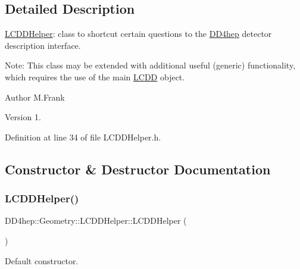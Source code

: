 \subsection{Detailed Description}
\hyperlink{class_d_d4hep_1_1_geometry_1_1_l_c_d_d_helper}{L\+C\+D\+D\+Helper}\+: class to shortcut certain questions to the \hyperlink{namespace_d_d4hep}{D\+D4hep} detector description interface. 

Note\+: This class may be extended with additional useful (generic) functionality, which requires the use of the main \hyperlink{class_d_d4hep_1_1_geometry_1_1_l_c_d_d}{L\+C\+DD} object.

\begin{DoxyAuthor}{Author}
M.\+Frank 
\end{DoxyAuthor}
\begin{DoxyVersion}{Version}
1. 
\end{DoxyVersion}


Definition at line 34 of file L\+C\+D\+D\+Helper.\+h.



\subsection{Constructor \& Destructor Documentation}
\hypertarget{class_d_d4hep_1_1_geometry_1_1_l_c_d_d_helper_af4232677be7028a073ac320fd77714e4}{}\label{class_d_d4hep_1_1_geometry_1_1_l_c_d_d_helper_af4232677be7028a073ac320fd77714e4} 
\subsubsection{\texorpdfstring{L\+C\+D\+D\+Helper()}{LCDDHelper()}\hspace{0.1cm}{\footnotesize\ttfamily [1/5]}}
{\footnotesize\ttfamily D\+D4hep\+::\+Geometry\+::\+L\+C\+D\+D\+Helper\+::\+L\+C\+D\+D\+Helper (\begin{DoxyParamCaption}{ }\end{DoxyParamCaption})\hspace{0.3cm}{\ttfamily [default]}}



Default constructor. 

\hypertarget{class_d_d4hep_1_1_geometry_1_1_l_c_d_d_helper_a35a63673b2c358741a64ff22e788361c}{}\label{class_d_d4hep_1_1_geometry_1_1_l_c_d_d_helper_a35a63673b2c358741a64ff22e788361c} 
